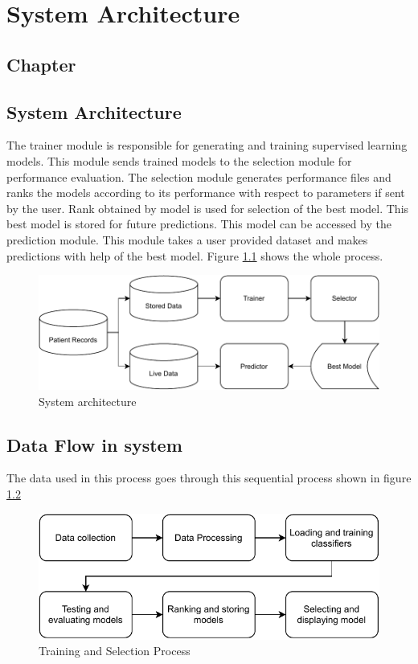 \thispagestyle{fancy}
\chapter{System Architecture} \label{ch:system_architecture}
\section*{\centering Chapter \thechapter}
\section*{\centering System Architecture}


The trainer module is responsible for generating and training supervised learning models. This module sends trained models to the selection module for performance evaluation. The selection module generates performance files and ranks the models according to its performance with respect to parameters if sent by the user. Rank obtained by model is used for selection of the best model. This best model is stored for future predictions. This model can be accessed by the prediction module. This module takes a user provided dataset and makes predictions with help of the best model. Figure \ref{fig:system_architecture} shows the whole process.

\begin{figure}[H]
  \centering
  \includegraphics[width=0.7\columnwidth]{media/architecture/System Architecture.pdf}
  \caption{System architecture}
  \label{fig:system_architecture}
\end{figure}

\section{Data Flow in system}

The data used in this process goes through this sequential process shown in figure \ref{fig:data_flow_in_system}

\begin{figure}[H]
  \centering
  \includegraphics[width=0.7\columnwidth]{media/website/architecture/Data_Flow_System.pdf}
  \caption{Training and Selection Process}
  \label{fig:data_flow_in_system}
\end{figure}

